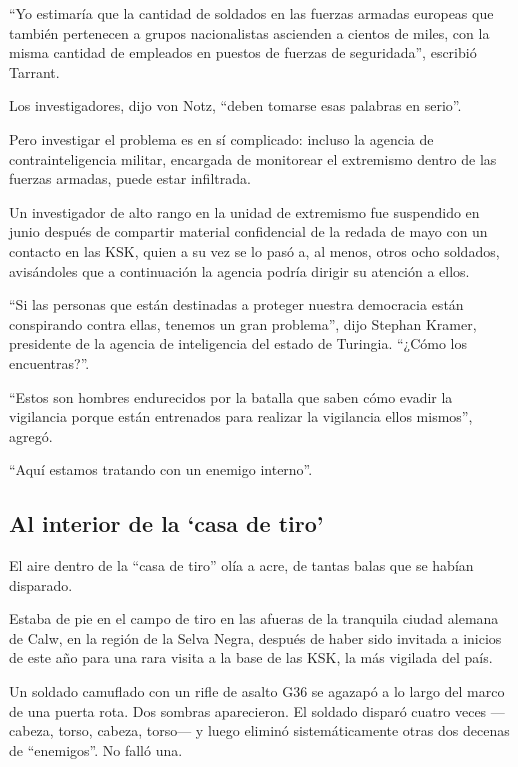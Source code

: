 ``Yo estimaría que la cantidad de soldados en las fuerzas armadas
europeas que también pertenecen a grupos nacionalistas ascienden a
cientos de miles, con la misma cantidad de empleados en puestos de
fuerzas de seguridada'', escribió Tarrant.

Los investigadores, dijo von Notz, ``deben tomarse esas palabras en
serio''.

Pero investigar el problema es en sí complicado: incluso la agencia de
contrainteligencia militar, encargada de monitorear el extremismo dentro
de las fuerzas armadas, puede estar infiltrada.

Un investigador de alto rango en la unidad de extremismo fue suspendido
en junio después de compartir material confidencial de la redada de mayo
con un contacto en las KSK, quien a su vez se lo pasó a, al menos, otros
ocho soldados, avisándoles que a continuación la agencia podría dirigir
su atención a ellos.

``Si las personas que están destinadas a proteger nuestra democracia
están conspirando contra ellas, tenemos un gran problema'', dijo Stephan
Kramer, presidente de la agencia de inteligencia del estado de Turingia.
``¿Cómo los encuentras?''.

``Estos son hombres endurecidos por la batalla que saben cómo evadir la
vigilancia porque están entrenados para realizar la vigilancia ellos
mismos'', agregó.

``Aquí estamos tratando con un enemigo interno''.

\hypertarget{al-interior-de-la-casa-de-tiro}{%
\subsection{Al interior de la `casa de
tiro'}\label{al-interior-de-la-casa-de-tiro}}

El aire dentro de la ``casa de tiro'' olía a acre, de tantas balas que
se habían disparado.

Estaba de pie en el campo de tiro en las afueras de la tranquila ciudad
alemana de Calw, en la región de la Selva Negra, después de haber sido
invitada a inicios de este año para una rara visita a la base de las
KSK, la más vigilada del país.

Un soldado camuflado con un rifle de asalto G36 se agazapó a lo largo
del marco de una puerta rota. Dos sombras aparecieron. El soldado
disparó cuatro veces ---cabeza, torso, cabeza, torso--- y luego eliminó
sistemáticamente otras dos decenas de ``enemigos''. No falló una.

